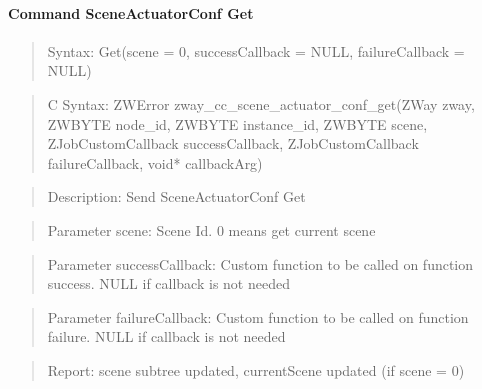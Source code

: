 \paragraph{Command SceneActuatorConf Get}
\begin{quote}Syntax: Get(scene = 0, successCallback = NULL, failureCallback = NULL)\end{quote}
\begin{quote}C Syntax: ZWError zway\_cc\_scene\_actuator\_conf\_get(ZWay zway, ZWBYTE node\_id, ZWBYTE instance\_id, ZWBYTE scene, ZJobCustomCallback successCallback, ZJobCustomCallback failureCallback, void* callbackArg)\end{quote}
\begin{quote}Description: Send SceneActuatorConf Get\end{quote}
\begin{quote}Parameter scene: Scene Id. 0 means get current scene\end{quote}
\begin{quote}Parameter successCallback: Custom function to be called on function success. NULL if callback is not needed\end{quote}
\begin{quote}Parameter failureCallback: Custom function to be called on function failure. NULL if callback is not needed\end{quote}
\begin{quote}Report: scene subtree updated, currentScene updated (if scene = 0)\end{quote}

